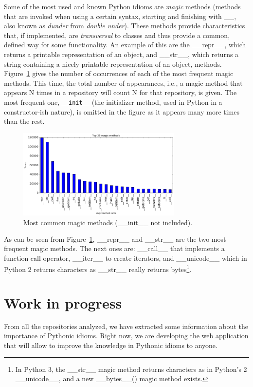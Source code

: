 \documentclass[a4paper]{article}
\begin{document}
Some of the most used and known Python idioms are \emph{magic} methods (methods that are invoked when using a certain syntax, starting and finishing with \_\_, also known as \emph{dunder} from \emph{double under}). These methods provide characteristics that, if implemented, are \emph{transversal} to classes and thus provide a common, defined way for some functionality. An example of this are the \_\_repr\_\_, which returns a printable representation of an object, and \_\_str\_\_, which returns a string containing a nicely printable representation of an object, methods. Figure~\ref{fig:magic_ranking} gives the number of occurrences of each of the most frequent magic methods. This time, the total number of appearances, i.e., a magic method that appears N times in a repository will count N for that repository, is given. The most frequent one, \verb|__init__| (the initializer method, used in Python in a constructor-ish nature), is omitted in the figure as it appears many more times than the rest.

\begin{figure}[ht]
\centering
\includegraphics[width=82mm]{img/magic_methods.png}
\caption{Most common magic methods (\_\_init\_\_ not included).}
\label{fig:magic_ranking}
\end{figure}

As can be seen from Figure~\ref{fig:magic_ranking}, \_\_repr\_\_ and \_\_str\_\_ are the two most frequent magic methods. The next ones are: \_\_call\_\_ that implements a function call operator, \_\_iter\_\_ to create iterators, and \_\_unicode\_\_ which in Python 2 returns characters as \_\_str\_\_ really returns bytes\footnote{In Python 3, the \_\_str\_\_ magic method returns characters as in Python's 2 \_\_unicode\_\_, and a new \_\_bytes\_\_() magic method exists.}.


\section{Work in progress}

From all the repositories analyzed, we have extracted some information about the importance of Pythonic idioms. Right now, we are developing the web application that will allow to improve the knowledge in Pythonic idioms to anyone.
\end{document}
